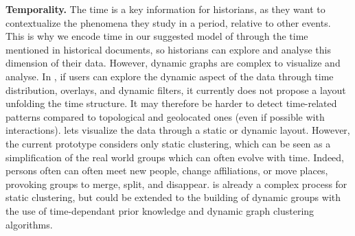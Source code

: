 \noindent\textbf{Temporality.} The time is a key information for historians, as they want to contextualize the phenomena they study in a period, relative to other events.
This is why we encode time in our suggested model of \modelplural through the time mentioned in historical documents, so historians can explore and analyse this dimension of their data.
However, dynamic graphs are complex to visualize and analyse.
In \combinet, if users can explore the dynamic aspect of the data through time distribution, overlays, and dynamic filters, it currently does not propose a layout unfolding the time structure.
It may therefore be harder to detect time-related patterns compared to topological and geolocated ones (even if possible with interactions).
\pkclustering lets visualize the data through a static or dynamic layout.
However, the current prototype considers only static clustering, which can be seen as a simplification of the real world groups which can often evolve with time\cite{rossettiCommunityDiscoveryDynamic2018}.
Indeed, persons often can often meet new people, change affiliations, or move places, provoking groups to merge, split, and disappear.
\pkclustering is already a complex process for static clustering, but could be extended to the building of dynamic groups with the use of time-dependant prior knowledge and dynamic graph clustering algorithms.


